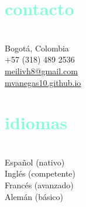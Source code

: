 \documentclass[espanol]{cv-style}          %
\begin{document}
\lastupdated


\begin{aside}
%
\vspace{2.5cm}
\section{\textcolor{aquamarine}{contacto}}\\
\vspace{0.2cm}
Bogotá, Colombia\\
\vspace{0.1cm}
+57 (318) 489 2536\\
\vspace{0.1cm}
{\href{mailto:meilivh8@gmail.com}{\underline{meilivh8@gmail.com}}}\\
\vspace{0.1cm}
{\href{https://mvanegas10.github.io}{\underline{mvanegas10.github.io}}}\\
%
\vspace{2.5cm}
\section{\textcolor{aquamarine}{idiomas}}\\
\vspace{0.2cm}
Español (nativo)\\
\vspace{0.1cm}
Inglés (competente)\\
\vspace{0.1cm}
Francés (avanzado)\\
\vspace{0.1cm}
Alemán (básico)\\
%
\vspace{2.5cm}

\end{aside}
\end{document}
